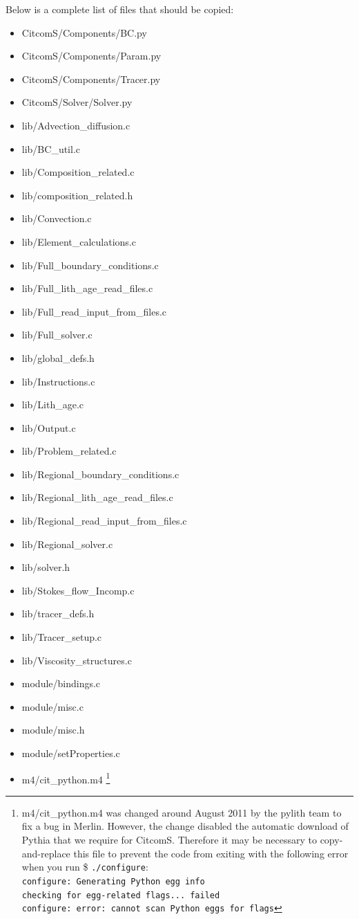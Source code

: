 \documentclass[letterpaper,12pt]{article}
\newcommand{\tm}[1]{\$ \texttt{#1}}
\newcommand{\tmo}[1]{\texttt{#1}}
\begin{document}
Below is a complete list of files that should be copied:
\begin{itemize}
\item CitcomS/Components/BC.py
\item CitcomS/Components/Param.py
\item CitcomS/Components/Tracer.py
\item CitcomS/Solver/Solver.py
\item lib/Advection\_diffusion.c
\item lib/BC\_util.c
\item lib/Composition\_related.c
\item lib/composition\_related.h
\item lib/Convection.c
\item lib/Element\_calculations.c
\item lib/Full\_boundary\_conditions.c
\item lib/Full\_lith\_age\_read\_files.c
\item lib/Full\_read\_input\_from\_files.c 
\item lib/Full\_solver.c
\item lib/global\_defs.h
\item lib/Instructions.c
\item lib/Lith\_age.c
\item lib/Output.c
\item lib/Problem\_related.c
\item lib/Regional\_boundary\_conditions.c
\item lib/Regional\_lith\_age\_read\_files.c
\item lib/Regional\_read\_input\_from\_files.c
\item lib/Regional\_solver.c
\item lib/solver.h
\item lib/Stokes\_flow\_Incomp.c
\item lib/tracer\_defs.h
\item lib/Tracer\_setup.c
\item lib/Viscosity\_structures.c
\item module/bindings.c
\item module/misc.c
\item module/misc.h
\item module/setProperties.c
\item m4/cit\_python.m4 \footnote{m4/cit\_python.m4 was changed around August 2011 by the pylith team to fix a bug in Merlin.  However, the change disabled the automatic download of Pythia that we require for CitcomS.  Therefore it may be necessary to copy-and-replace this file to prevent the code from exiting with the following error when you run \tm{./configure}:\\
\tmo{configure: Generating Python egg info\\checking for egg-related flags... failed\\configure: error: cannot scan Python eggs for flags}}
\end{itemize}
\end{document}
